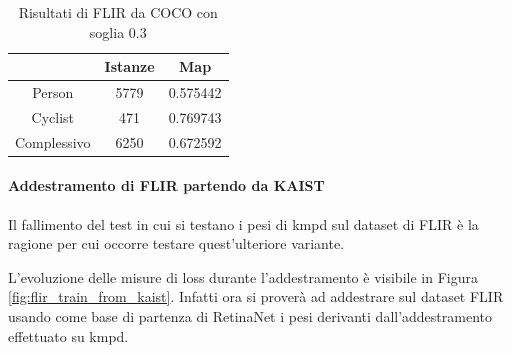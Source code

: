 \begin{table}[]
    \centering
    \begin{tabular}{c|c|c|}
    \cline{2-3}
     & Istanze & Map \\ \hline
    \multicolumn{1}{|c|}{Person} & 5779 & 0.575442 \\ \hline
    \multicolumn{1}{|c|}{Cyclist} & 471 & 0.769743 \\ \hline
    \multicolumn{1}{|c|}{Complessivo} & 6250 & 0.672592 \\ \hline
    \end{tabular}
    \caption{Risultati di FLIR da COCO con soglia $0.3$}
    \label{table:coco_result_best_flir}
\end{table}


\paragraph{Addestramento di FLIR partendo da KAIST}
Il fallimento del test in cui si testano i pesi di \ac{kmpd} sul dataset di FLIR è la ragione per cui occorre testare quest'ulteriore variante.

L'evoluzione delle misure di loss durante l'addestramento è visibile in Figura \ref{fig:flir_train_from_kaist}. Infatti ora si proverà ad addestrare sul dataset FLIR usando come base di partenza di RetinaNet i pesi derivanti dall'addestramento effettuato su \ac{kmpd}.


